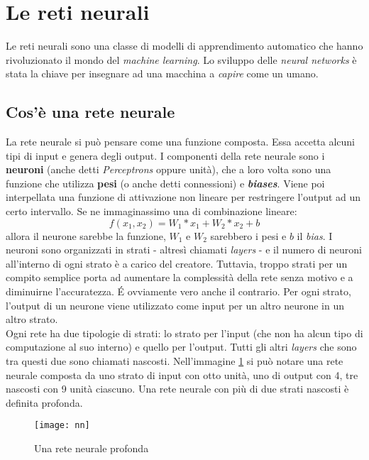 \section{Le reti neurali}
Le reti neurali sono una classe di modelli di apprendimento automatico che hanno rivoluzionato il mondo del \textit{machine learning}.
Lo sviluppo delle \textit{neural networks} è stata la chiave per insegnare ad una macchina a \textit{capire} come un umano. 

\subsection*{Cos'è una rete neurale}
La rete neurale si può pensare come una funzione composta. Essa accetta alcuni tipi di input e genera degli output. I componenti della rete neurale sono i \textbf{neuroni} (anche detti \textit{Perceptrons} oppure unità), che a loro volta sono una funzione che utilizza \textbf{pesi} (o anche detti connessioni) e \textbf{\textit{biases}}. Viene poi interpellata una \gls{funzione di attivazione} non lineare per restringere l'output ad un certo intervallo. Se ne immaginassimo una di combinazione lineare:
\[f(x_1, x_2)=W_1*x_1 + W_2*x_2 + b\]
allora il neurone sarebbe la funzione, $W_1$ e $W_2$ sarebbero i pesi e $b$ il \textit{bias}.
I neuroni sono organizzati in strati - altresì chiamati \textit{layers} - e il numero di neuroni all'interno di ogni strato è a carico del creatore. Tuttavia, troppo strati per un compito semplice porta ad aumentare la complessità della rete senza motivo e a diminuirne l'accuratezza. \'E ovviamente vero anche il contrario. Per ogni strato, l'output di un neurone viene utilizzato come input per un altro neurone in un altro strato.
\medskip
\\Ogni rete ha due tipologie di strati: lo strato per l'input (che non ha alcun tipo di computazione al suo interno) e quello per l'output. Tutti gli altri \textit{layers} che sono tra questi due sono chiamati nascosti. Nell'immagine \ref{img:nn} si può notare una rete neurale composta da uno strato di input con otto unità, uno di output con 4, tre nascosti con 9 unità ciascuno. Una rete neurale con più di due strati nascosti è definita profonda.
\begin{figure}[!h] 
    \centering 
    \texttt{[image: nn]} 
    \caption{Una rete neurale profonda}
    \label{img:nn}
\end{figure}

